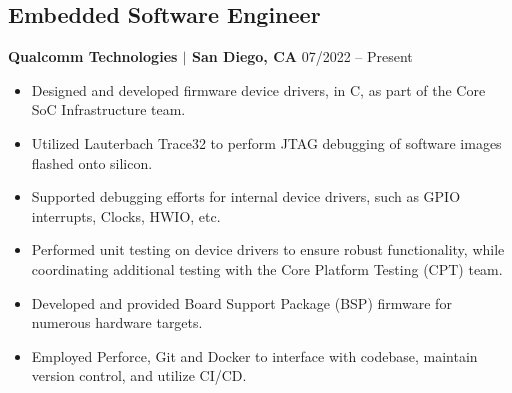 \documentclass{article}
\begin{document}
\subsection{Embedded Software Engineer}{\bf Qualcomm Technologies $\mid$ San Diego, CA} \hfill {07/2022 -- Present}\\
\vspace{-.2in}
\begin{itemize}
    \itemsep-.2em
    \item Designed and developed firmware device drivers, in C, as part of the Core SoC Infrastructure team.
    \item Utilized Lauterbach Trace32 to perform JTAG debugging of software images flashed onto silicon.
    \item Supported debugging efforts for internal device drivers, such as GPIO interrupts, Clocks, HWIO, etc.
    \item Performed unit testing on device drivers to ensure robust functionality, while coordinating additional testing with the Core Platform Testing (CPT) team.
    \item Developed and provided Board Support Package (BSP) firmware for numerous hardware targets.
    \item Employed Perforce, Git and Docker to interface with codebase, maintain version control, and utilize CI/CD.
\end{itemize}
\end{document}
